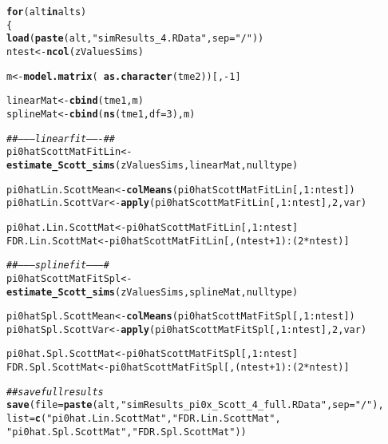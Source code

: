 \documentclass{article}\usepackage[]{graphicx}\usepackage[]{color}
\makeatletter
\newcommand{\hlnum}[1]{\textcolor[rgb]{0.686,0.059,0.569}{#1}}%
\newcommand{\hlstr}[1]{\textcolor[rgb]{0.192,0.494,0.8}{#1}}%
\newcommand{\hlcom}[1]{\textcolor[rgb]{0.678,0.584,0.686}{\textit{#1}}}%
\newcommand{\hlopt}[1]{\textcolor[rgb]{0,0,0}{#1}}%
\newcommand{\hlstd}[1]{\textcolor[rgb]{0.345,0.345,0.345}{#1}}%
\newcommand{\hlkwa}[1]{\textcolor[rgb]{0.161,0.373,0.58}{\textbf{#1}}}%
\newcommand{\hlkwb}[1]{\textcolor[rgb]{0.69,0.353,0.396}{#1}}%
\newcommand{\hlkwc}[1]{\textcolor[rgb]{0.333,0.667,0.333}{#1}}%
\newcommand{\hlkwd}[1]{\textcolor[rgb]{0.737,0.353,0.396}{\textbf{#1}}}%
\newenvironment{kframe}{%
 \def\at@end@of@kframe{}%
 \ifinner\ifhmode%
  \def\at@end@of@kframe{\end{minipage}}%
  \begin{minipage}{\columnwidth}%
 \fi\fi%
 \def\FrameCommand##1{\hskip\@totalleftmargin \hskip-\fboxsep
 \colorbox{shadecolor}{##1}\hskip-\fboxsep
     \hskip-\linewidth \hskip-\@totalleftmargin \hskip\columnwidth}%
 \MakeFramed {\advance\hsize-\width
   \@totalleftmargin\z@ \linewidth\hsize
   \@setminipage}}%
 {\par\unskip\endMakeFramed%
 \at@end@of@kframe}
\newenvironment{knitrout}{}{} %
\makeatother
\begin{document}
\begin{knitrout}
\color{fgcolor}\begin{kframe}
\begin{alltt}
\hlkwa{for}\hlstd{(alt} \hlkwa{in} \hlstd{alts)}
\hlstd{\{}
  \hlkwd{load}\hlstd{(}\hlkwd{paste}\hlstd{(alt,}\hlstr{"simResults_4.RData"}\hlstd{,}\hlkwc{sep}\hlstd{=}\hlstr{"/"}\hlstd{))}
  \hlstd{ntest} \hlkwb{<-} \hlkwd{ncol}\hlstd{(zValuesSims)}

  \hlstd{m} \hlkwb{<-} \hlkwd{model.matrix}\hlstd{(}\hlopt{~}\hlkwd{as.character}\hlstd{(tme2))[,}\hlopt{-}\hlnum{1}\hlstd{]}

  \hlstd{linearMat} \hlkwb{<-} \hlkwd{cbind}\hlstd{(tme1, m)}
  \hlstd{splineMat} \hlkwb{<-} \hlkwd{cbind}\hlstd{(}\hlkwd{ns}\hlstd{(tme1,}\hlkwc{df}\hlstd{=}\hlnum{3}\hlstd{), m)}

  \hlcom{##--------linear fit-------##}
  \hlstd{pi0hatScottMatFitLin} \hlkwb{<-} \hlkwd{estimate_Scott_sims}\hlstd{(zValuesSims, linearMat, nulltype)}

  \hlstd{pi0hatLin.ScottMean} \hlkwb{<-} \hlkwd{colMeans}\hlstd{(pi0hatScottMatFitLin[,}\hlnum{1}\hlopt{:}\hlstd{ntest])}
  \hlstd{pi0hatLin.ScottVar} \hlkwb{<-} \hlkwd{apply}\hlstd{(pi0hatScottMatFitLin[,}\hlnum{1}\hlopt{:}\hlstd{ntest],}\hlnum{2}\hlstd{,var)}

  \hlstd{pi0hat.Lin.ScottMat} \hlkwb{<-} \hlstd{pi0hatScottMatFitLin[,}\hlnum{1}\hlopt{:}\hlstd{ntest]}
  \hlstd{FDR.Lin.ScottMat} \hlkwb{<-} \hlstd{pi0hatScottMatFitLin[,(ntest}\hlopt{+}\hlnum{1}\hlstd{)}\hlopt{:}\hlstd{(}\hlnum{2}\hlopt{*}\hlstd{ntest)]}

  \hlcom{##---------spline fit---------#}
  \hlstd{pi0hatScottMatFitSpl} \hlkwb{<-} \hlkwd{estimate_Scott_sims}\hlstd{(zValuesSims, splineMat, nulltype)}

  \hlstd{pi0hatSpl.ScottMean} \hlkwb{<-} \hlkwd{colMeans}\hlstd{(pi0hatScottMatFitSpl[,}\hlnum{1}\hlopt{:}\hlstd{ntest])}
  \hlstd{pi0hatSpl.ScottVar} \hlkwb{<-} \hlkwd{apply}\hlstd{(pi0hatScottMatFitSpl[,}\hlnum{1}\hlopt{:}\hlstd{ntest],}\hlnum{2}\hlstd{,var)}

  \hlstd{pi0hat.Spl.ScottMat} \hlkwb{<-} \hlstd{pi0hatScottMatFitSpl[,}\hlnum{1}\hlopt{:}\hlstd{ntest]}
  \hlstd{FDR.Spl.ScottMat} \hlkwb{<-} \hlstd{pi0hatScottMatFitSpl[,(ntest}\hlopt{+}\hlnum{1}\hlstd{)}\hlopt{:}\hlstd{(}\hlnum{2}\hlopt{*}\hlstd{ntest)]}

  \hlcom{##save full results}
  \hlkwd{save}\hlstd{(}\hlkwc{file}\hlstd{=}\hlkwd{paste}\hlstd{(alt,}\hlstr{"simResults_pi0x_Scott_4_full.RData"}\hlstd{,}\hlkwc{sep}\hlstd{=}\hlstr{"/"}\hlstd{),}
       \hlkwc{list}\hlstd{=}\hlkwd{c}\hlstd{(}\hlstr{"pi0hat.Lin.ScottMat"}\hlstd{,} \hlstr{"FDR.Lin.ScottMat"}\hlstd{,}
              \hlstr{"pi0hat.Spl.ScottMat"}\hlstd{,} \hlstr{"FDR.Spl.ScottMat"}\hlstd{))}


\end{alltt}
\end{kframe}
\end{knitrout}
\end{document}
